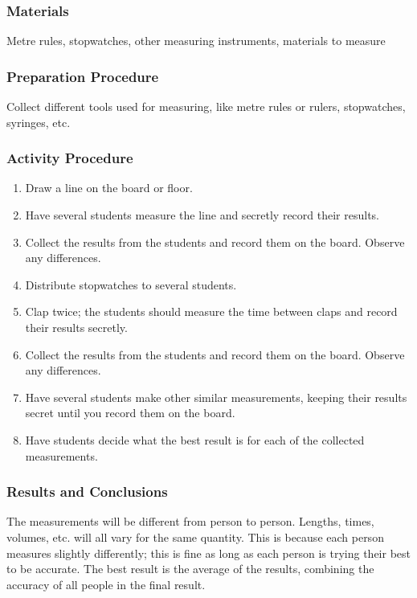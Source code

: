 \subsubsection*{Materials}
Metre rules, stopwatches, other measuring instruments, materials to measure

\subsubsection*{Preparation Procedure}
Collect different tools used for measuring, like metre rules or rulers, stopwatches, syringes, etc.

\subsubsection*{Activity Procedure}
\begin{enumerate}
\item{Draw a line on the board or floor.}
\item{Have several students measure the line and secretly record their results.}
\item{Collect the results from the students and record them on the board. Observe any differences.}
\item{Distribute stopwatches to several students.}
\item{Clap twice; the students should measure the time between claps and record their results secretly.}
\item{Collect the results from the students and record them on the board. Observe any differences.}
\item{Have several students make other similar measurements, keeping their results secret until you record them on the board.}
\item{Have students decide what the best result is for each of the collected measurements.}
\end{enumerate}

\subsubsection*{Results and Conclusions}
The measurements will be different from person to person. Lengths, times, volumes, etc. will all vary for the same quantity. This is because each person measures slightly differently; this is fine as long as each person is trying their best to be accurate. The best result is the average of the results, combining the accuracy of all people in the final result.

